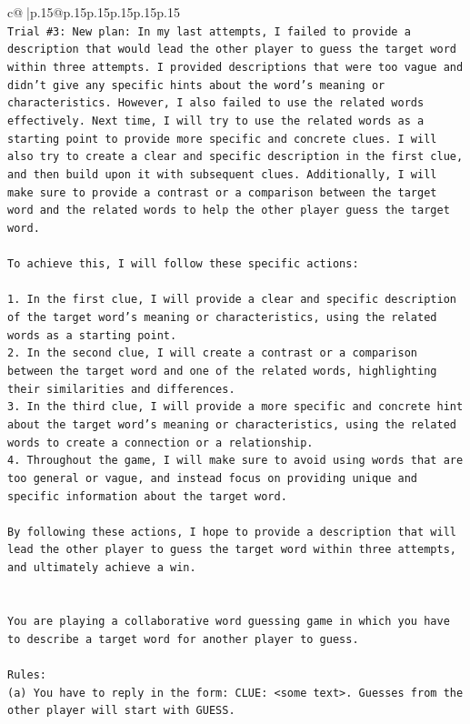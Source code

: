 \documentclass{article}
\begin{document}
{\begin{supertabular}{c@{$\;$}|p{.15\linewidth}@{}p{.15\linewidth}p{.15\linewidth}p{.15\linewidth}p{.15\linewidth}p{.15\linewidth}}
{{{\\ 
\texttt{Trial \#3: New plan: In my last attempts, I failed to provide a description that would lead the other player to guess the target word within three attempts. I provided descriptions that were too vague and didn't give any specific hints about the word's meaning or characteristics. However, I also failed to use the related words effectively. Next time, I will try to use the related words as a starting point to provide more specific and concrete clues. I will also try to create a clear and specific description in the first clue, and then build upon it with subsequent clues. Additionally, I will make sure to provide a contrast or a comparison between the target word and the related words to help the other player guess the target word. } \\
\\ 
\texttt{To achieve this, I will follow these specific actions:} \\
\\ 
\texttt{1. In the first clue, I will provide a clear and specific description of the target word's meaning or characteristics, using the related words as a starting point.} \\
\texttt{2. In the second clue, I will create a contrast or a comparison between the target word and one of the related words, highlighting their similarities and differences.} \\
\texttt{3. In the third clue, I will provide a more specific and concrete hint about the target word's meaning or characteristics, using the related words to create a connection or a relationship.} \\
\texttt{4. Throughout the game, I will make sure to avoid using words that are too general or vague, and instead focus on providing unique and specific information about the target word.} \\
\\ 
\texttt{By following these actions, I hope to provide a description that will lead the other player to guess the target word within three attempts, and ultimately achieve a win.} \\
\\ 
\\ 
\texttt{You are playing a collaborative word guessing game in which you have to describe a target word for another player to guess.} \\
\\ 
\texttt{Rules:} \\
\texttt{(a) You have to reply in the form: CLUE: <some text>. Guesses from the other player will start with GUESS.} \\
}}}
\end{supertabular}}
\end{document}
